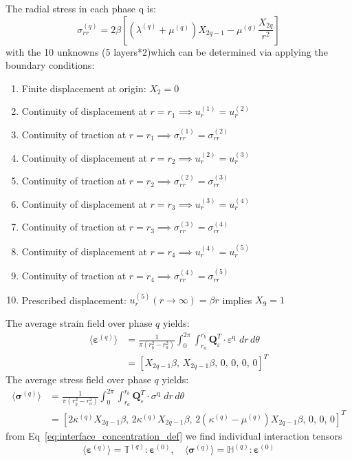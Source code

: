 \documentclass[oneside, 12pt, a4paper, bibliography=totoc]{book}
\newcommand{\bs}[1]{\bm{#1}}                       %
\begin{document}
The radial stress in each phase q is:
%
\begin{equation}
    \sigma_{rr}^{(q)} = 2\beta\left[(\lambda^{(q)} + \mu^{(q)}) X_{2q-1} - \mu^{(q)} \frac{X_{2q}}{r^2}\right]
    \label{eq:sigma_rr_bulk}
\end{equation}with the 10 unknowns (5 layers*2)which can be determined via applying the boundary conditions: 
\begin{enumerate}
    \item Finite displacement at origin: $X_2 = 0$
    \item Continuity of displacement at  $r = r_1\implies u_r^{(1)} = u_r^{(2)}$
    \item Continuity of traction at  $r = r_1 \implies \sigma_{rr}^{(1)} = \sigma_{rr}^{(2)}$
    \item Continuity of displacement at  $r = r_2\implies u_r^{(2)} = u_r^{(3)}$
    \item Continuity of traction at  $r = r_2 \implies \sigma_{rr}^{(2)} = \sigma_{rr}^{(3)}$
    \item Continuity of displacement at  $r = r_3\implies u_r^{(3)} = u_r^{(4)}$
    \item Continuity of traction at  $r = r_3 \implies \sigma_{rr}^{(3)} = \sigma_{rr}^{(4)}$
    \item Continuity of displacement at  $r = r_4\implies u_r^{(4)} = u_r^{(5)}$
    \item Continuity of traction at  $r = r_4 \implies \sigma_{rr}^{(4)} = \sigma_{rr}^{(5)}$
    \item Prescribed displacement: $u_r^{(5)}(r \to \infty) = \beta r$ implies $X_9 = 1$
\end{enumerate}

The average strain field over phase $q$ yields:
%
\begin{align}
\langle \bs{\varepsilon}^{(q)} \rangle
&=
\frac{1}{\pi\left(r_b^{2}-r_a^{2}\right)}
\int_{0}^{2\pi}
\int_{r_a}^{r_b}
\mathbf{Q}_{\varepsilon}^{T}\cdot \varepsilon^{\text{q}}
\,  \, dr\, d\theta\, \\ 
&= [X_{2q-1}\beta, \, X_{2q-1}\beta, \, 0, \, 0, \, 0, \, 0]^T
    \label{eq:avg_strain_bulk_fiber}
\end{align}
The average stress field over phase $q$ yields:
\begin{align}
\langle \bs{\sigma}^{(q)} \rangle
&=
\frac{1}{\pi\left(r_b^{2}-r_a^{2}\right)}
\int_{0}^{2\pi}
\int_{r_a}^{r_b}
\mathbf{Q}_{\varepsilon}^{T}\cdot \sigma^{\text{q}}
\, \, dr\, d\theta\,  \\
&= [2\kappa^{(q)} X_{2q-1}\beta, \, 2\kappa^{(q)} X_{2q-1}\beta, \, 2(\kappa^{(q)}-\mu^{(q)}) X_{2q-1}\beta, \, 0, \, 0, \, 0]^T
    \label{eq:avg_stress_bulk_fiber}
\end{align}
from Eq~\ref{eq:interface_concentration_def} we find individual interaction tensors 
\begin{equation}
    \langle \bs{\varepsilon}^{(q)} \rangle = \mathbb{T}^{(q)} : \bs{\varepsilon}^{(0)}, \quad
    \langle \bs{\sigma}^{(q)} \rangle = \mathbb{H}^{(q)} : \bs{\varepsilon}^{(0)}
\end{equation}
\end{document}
